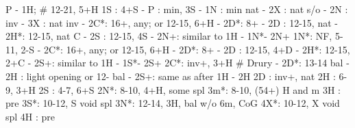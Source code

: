 P - 1H;  # 12-21, 5+H
1S : 4+S
   - P  : min, 3S
   - 1N : min nat
        - 2X : nat s/o
        - 2N : inv
        - 3X : nat inv
   - 2C*: 16+, any; or 12-15, 6+H
        - 2D*: 8+
   - 2D : 12-15, nat
   - 2H*: 12-15, nat C
   - 2S : 12-15, 4S
   - 2N+: similar to 1H - 1N*- 2N+
1N*: NF, 5-11, 2-S
   - 2C*: 16+, any; or 12-15, 6+H
        - 2D*: 8+
   - 2D : 12-15, 4+D
   - 2H*: 12-15, 2+C
   - 2S+: similar to 1H - 1S*- 2S+
2C*: inv+, 3+H  # Drury
   - 2D*: 13-14 bal
   - 2H : light opening or 12- bal
   - 2S+: same as after 1H - 2H
2D : inv+, nat
2H : 6-9, 3+H
2S : 4-7, 6+S
2N*: 8-10, 4+H, some spl
3m*: 8-10, (54+) H and m
3H : pre
3S*: 10-12, S void spl
3N*: 12-14, 3H, bal w/o 6m, CoG
4X*: 10-12, X void spl
4H : pre